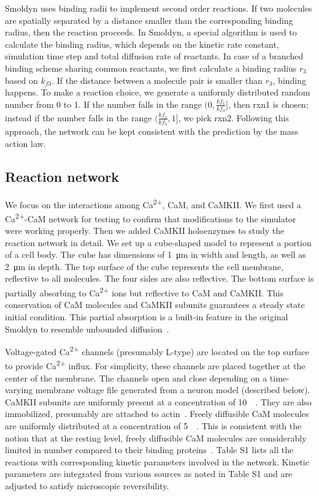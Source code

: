 \documentclass[10pt,letterpaper]{article}
\begin{document}
Smoldyn uses binding radii to implement second order reactions. If two molecules are spatially separated by a distance smaller than the corresponding binding radius, then the reaction proceeds. In Smoldyn, a special algorithm is used to calculate the binding radius, which depends on the kinetic rate constant, simulation time step and total diffusion rate of reactants. In case of a branched binding scheme sharing common reactants, we first calculate a binding radius $r_3$ based on $k_{f3}$. If the distance between a molecule pair is smaller than $r_3$, binding happens. To make a reaction choice, we generate a uniformly distributed random number from 0 to 1. If the number falls in the range $(0,\frac{kf_1}{kf_3}]$, then rxn1 is chosen; instead if the number falls in the range $(\frac{kf_1}{kf_3}, 1]$, we pick rxn2. Following this approach, the network can be kept consistent with the prediction by the mass action law. 

\subsection*{Reaction network}
We focus on the interactions among Ca\textsuperscript{2+}, CaM, and CaMKII. We first used a Ca\textsuperscript{2+}-CaM network for testing to confirm that modifications to the simulator were working properly. Then we added CaMKII holoenzymes to study the reaction network in detail. We set up a cube-shaped model to represent a portion of a cell body. The cube has dimensions of \SI{1}{\um} in width and length, as well as \SI{2}{\um} in depth. The top surface of the cube represents the cell membrane, reflective to all molecules. The four sides are also reflective. The bottom surface is partially absorbing to Ca\textsuperscript{2+} ions but reflective to CaM and CaMKII. This conservation of CaM molecules and CaMKII subunits guarantees a steady state initial condition. This partial absorption is a built-in feature in the original Smoldyn to resemble unbounded diffusion~\cite{Andrews:2009dr}.


Voltage-gated Ca\textsuperscript{2+} channels (presumably L-type) are located on the top surface to provide Ca\textsuperscript{2+} influx. For simplicity, these channels are placed together at the center of the membrane. The channels open and close depending on a time-varying membrane voltage file generated from a neuron model (described below). CaMKII subunits are uniformly present at a concentration of \SI{10}{\micro\Molar}. They are also immobilized, presumably are attached to actin~\cite{Li:2016cq}. Freely diffusible CaM molecules are uniformly distributed at a concentration of \SI{5}{\micro\Molar}. This is consistent with the notion that at the resting level, freely diffusible CaM molecules are considerably limited in number compared to their binding proteins~\cite{Tran:2003fs,2008BpJ....95.6002S,LubyPhelps:1995kl}. Table S1 lists all the reactions with corresponding kinetic parameters involved in the network. Kinetic parameters are integrated from various sources as noted in Table S1 and are adjusted to satisfy microscopic reversibility. 
\end{document}

